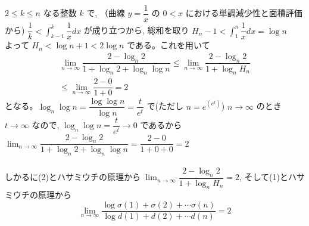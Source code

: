 $2\le k\le n$ なる整数 $k$ で, （曲線 $y=\dfrac{1}{x}$ の $0<x$ における単調減少性と面積評価から) $\dfrac{1}{k}<\displaystyle\int_{k-1}^{k} \dfrac{1}{x} dx$ が成り立つから, 総和を取り $H_n-1<\displaystyle\int_1^{n}\dfrac{1}{x} dx=\log{n} $ \\
よって $H_n<\log{n}+1<2\log{n}$ である。これを用いて
\begin{eqnarray*}
\displaystyle\lim_{n\to\infty}\dfrac{2-\log_n{2}}{1+\log_n{2}+\log_n{\log{n}}}\le\displaystyle\lim_{n\to\infty}\dfrac{2-\log_n{2}}{1+\log_n{H_n}}\\
\le\displaystyle\lim_{n\to\infty}\dfrac{2-0}{1+0}=2 
\end{eqnarray*}
となる。$\log_n{\log{n}}=\dfrac{\log{\log{n}}}{\log{n}}=\dfrac{t}{e^t}$ で(ただし $n= e^{(e^t)}$) $n\rightarrow \infty$ のとき $t\rightarrow \infty$ なので, $\log_n{\log{n}}=\dfrac{t}{e^t}\rightarrow 0$ であるから $\displaystyle\lim_{n\to\infty}\dfrac{2-\log_n{2}}{1+\log_n{2}+\log_n{\log{n}}}=\dfrac{2-0}{1+0+0}=2$\\
\\
しかるに(2)とハサミウチの原理から $\displaystyle\lim_{n\to\infty}\dfrac{2-\log_n{2}}{1+\log_n{H_n}}=2$, そして(1)とハサミウチの原理から
\[\displaystyle\lim_{n\to\infty }\dfrac{\log{\sigma(1) +\sigma (2)+\cdots \sigma (n)}}{\log{d(1)+d(2)+\cdots d(n)}}=2\]
